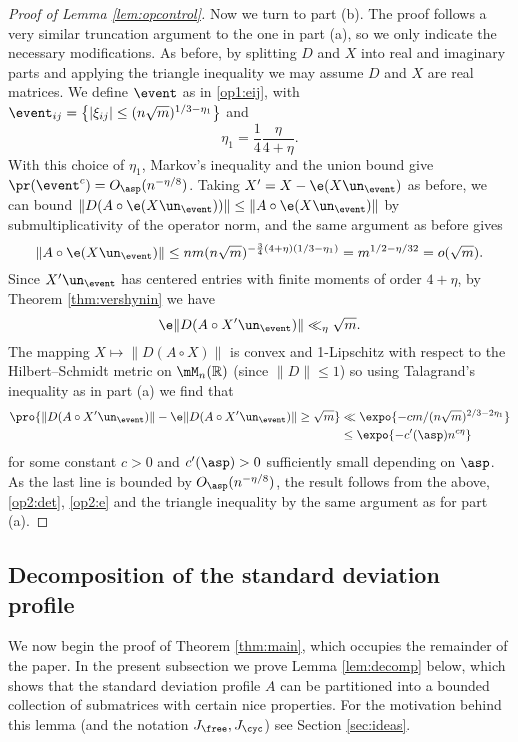 \documentclass[aop,preprint]{imsart}
\theoremstyle{plain}
\theoremstyle{definition}
\theoremstyle{remark}
\numberwithin{equation}{section}
\numberwithin{theorem}{section}
\begin{document}
\begin{proof}[Proof of Lemma \ref{lem:opcontrol}]
Now we turn to part (b). 
The proof follows a very similar truncation argument to the one in part (a), so we only indicate the necessary modifications.
As before, by splitting $D$ and $X$ into real and imaginary parts and applying the triangle inequality we may assume $D$ and $X$ are real matrices. 
We define $\event$ as in \eqref{op1:eij}, with 
$
\event_{ij}= \big\{ |\xi_{ij}|\le (n\sqrt{m})^{1/3-\eta_1}\big\}
$
and 
\begin{equation}
\eta_1= \frac{1}{4}\frac{\eta}{4+\eta}.
\end{equation}
With this choice of $\eta_1$, Markov's inequality and the union bound give $\pr(\event^c) = O_{\asp} (n^{-\eta/8})$.
Taking $X'= X-\e(X\un_\event)$ as before, we can bound
$
\|D(A\circ \e(X\un_\event))\| \le \|A\circ \e(X\un_\event)\|
$
by submultiplicativity of the operator norm, and the same argument as before gives
\begin{equation}	\label{op2:det}
\|A\circ \e(X\un_\event)\| \le  nm(n\sqrt{m})^{-\frac34(4+\eta)(1/3-\eta_1)} = m^{1/2-\eta/32} = o(\sqrt{m}).
\end{equation}
Since $X'\un_{\event}$ has centered entries with finite moments of order $4+\eta$, by Theorem \ref{thm:vershynin} we have
\begin{equation}	\label{op2:e}
\e \|D(A\circ X'\un_\event)\| \ll_\eta \sqrt{m}.
\end{equation}
The mapping $X\mapsto \|D(A\circ X)\|$ is convex and 1-Lipschitz with respect to the Hilbert--Schmidt metric on $\mM_{n}(\R)$ (since $\|D\|\le 1$) so using Talagrand's inequality as in part (a) we find that 
\begin{align*}
\pro{ \|D(A\circ X'\un_\event)\| - \e \|D(A\circ X'\un_\event)\| \ge \sqrt{m}} 
&\ll \expo{ -c  m / (n\sqrt{m})^{2/3-2\eta_1}}\\
&\le \expo{-c'(\asp)  n^{c\eta } }
\end{align*}
for some constant $c>0$ and $c'(\asp)>0$ sufficiently small depending on $\asp$. 
As the last line is bounded by $O_{\asp}(n^{-\eta/8})$, the result follows from the above, \eqref{op2:det}, \eqref{op2:e} and the triangle inequality by the same argument as for part (a). 
\end{proof}


\subsection{Decomposition of the standard deviation profile}	\label{sec:decomp}

We now begin the proof of Theorem \ref{thm:main}, which occupies the remainder of the paper. 
In the present subsection we prove Lemma \ref{lem:decomp} below, which shows that the standard deviation profile $A$ can be partitioned into a bounded collection of submatrices with certain nice properties.
For the motivation behind this lemma (and the notation $J_{\free},J_{\cyc}$) see Section \ref{sec:ideas}.
\end{document}

